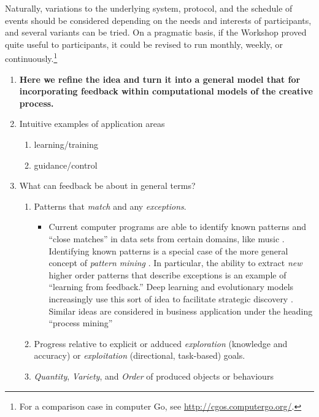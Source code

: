 Naturally, variations to the underlying system, protocol, and the
schedule of events should be considered depending on the needs and
interests of participants, and several variants can be tried.  On a
pragmatic basis, if the Workshop proved quite useful to participants,
it could be revised to run monthly, weekly, or
continuously.\footnote{For a comparison case in computer Go, see
  \url{http://cgos.computergo.org/}.}

\begin{enumerate}[start=2]
\item \textbf{Here we refine the idea and turn it into a general model
  that for incorporating feedback within computational models of the
  creative process.}
\item[] Intuitive examples of application areas
\begin{enumerate}
\item learning/training
\item guidance/control
\end{enumerate}
\item[] What can feedback be about in general terms? 
\begin{enumerate}
\item Patterns that \emph{match} and any \emph{exceptions}. 
\begin{itemize}
\item Current computer programs are able to identify known patterns
  and ``close matches'' in data sets from certain domains, like music
  \cite{meredith2002algorithms}.  Identifying known patterns is a
  special case of the more general concept of \emph{pattern mining}
  \cite{bergeron2007representation}.  In particular, the ability to
  extract \emph{new} higher order patterns that describe exceptions is
  an example of ``learning from feedback.''  Deep learning and
  evolutionary models increasingly use this sort of idea to facilitate
  strategic discovery \cite{samothrakis2011approximating}.  Similar
  ideas are considered in business application under the heading
  ``process mining'' \cite{van2011process}
\end{itemize}
\item Progress relative to explicit or adduced \emph{exploration}
  (knowledge and accuracy) or \emph{exploitation} (directional,
  task-based) goals.
\item \emph{Quantity}, \emph{Variety}, and \emph{Order} of produced
  objects or behaviours

\end{enumerate}
\end{enumerate}
